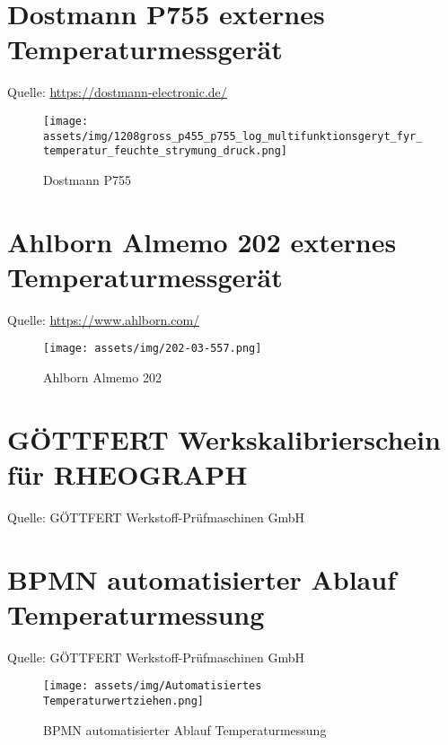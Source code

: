 
\clearpage

\section{Dostmann P755 externes Temperaturmessgerät}
Quelle: \href{https://dostmann-electronic.de/gallery/1208gross_p455_p755_log_multifunktionsgeryt_fyr_temperatur_feuchte_strymung_druck.gif}{https://dostmann-electronic.de/}
\begin{figure}[ht]
    \begin{center}
        \texttt{[image: assets/img/1208gross\_p455\_p755\_log\_multifunktionsgeryt\_fyr\_temperatur\_feuchte\_strymung\_druck.png]}
        \caption{Dostmann P755}
        \label{dostmann_p755}
    \end{center}
\end{figure}
\clearpage

\section{Ahlborn Almemo 202 externes Temperaturmessgerät}
Quelle: \href{https://www.ahlborn.com/pictures/202-03-557.png}{https://www.ahlborn.com/}
\begin{figure}[ht]
    \begin{center}
        \texttt{[image: assets/img/202-03-557.png]}
        \caption{Ahlborn Almemo 202}
        \label{almemo_202}
    \end{center}
\end{figure}
\clearpage

\section{GÖTTFERT Werkskalibrierschein für RHEOGRAPH}\label{wks_rheograph}
Quelle: GÖTTFERT Werkstoff-Prüfmaschinen GmbH

\clearpage

\section{BPMN automatisierter Ablauf Temperaturmessung}
Quelle: GÖTTFERT Werkstoff-Prüfmaschinen GmbH
\begin{figure}[ht]
    \begin{center}
        \texttt{[image: assets/img/Automatisiertes Temperaturwertziehen.png]}
        \caption{BPMN automatisierter Ablauf Temperaturmessung}
        \label{bpmn_auto_temp}
    \end{center}
\end{figure}
\clearpage

